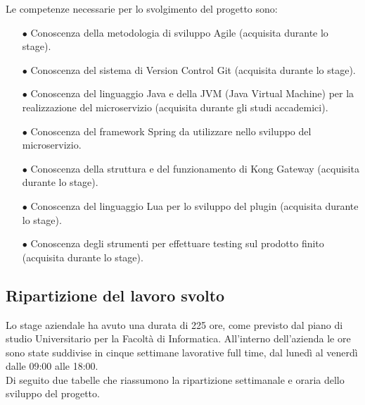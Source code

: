 Le competenze necessarie per lo svolgimento del progetto sono:
\begin{itemize}
	\item[$\bullet$]Conoscenza della metodologia di sviluppo Agile (acquisita durante lo stage).
	\item[$\bullet$]Conoscenza del sistema di Version Control Git (acquisita durante lo stage).
	\item[$\bullet$]Conoscenza del linguaggio Java e della JVM (Java Virtual Machine) per la realizzazione del microservizio (acquisita durante gli studi accademici).
	\item[$\bullet$]Conoscenza del framework Spring da utilizzare nello sviluppo del microservizio.
	\item[$\bullet$]Conoscenza della struttura e del funzionamento di Kong Gateway (acquisita durante lo stage).
	\item[$\bullet$]Conoscenza del linguaggio Lua per lo sviluppo del plugin (acquisita durante lo stage).
	\item[$\bullet$]Conoscenza degli strumenti per effettuare testing sul prodotto finito (acquisita durante lo stage).
\end{itemize}

\subsection{Ripartizione del lavoro svolto}\label{sec:ripartizionelavoro}
Lo stage aziendale ha avuto una durata di 225 ore, come previsto dal piano di studio Universitario per la Facoltà di Informatica. All’interno dell’azienda le ore sono state suddivise in cinque settimane lavorative full time, dal lunedì al venerdì dalle 09:00 alle 18:00.\\
Di seguito due tabelle che riassumono la ripartizione settimanale e oraria dello sviluppo del progetto.\\

